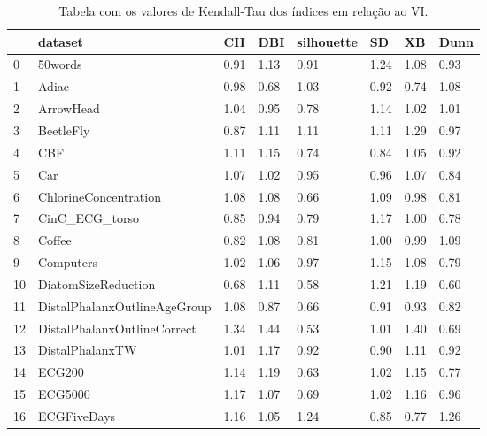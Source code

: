 \begin{longtable}{llllllll}
	\caption{Tabela com os valores de Kendall-Tau dos índices em relação ao VI.}
	 \label{tbl:coherence}\\
	\toprule
	{} &                         dataset &    CH &   DBI & silhouette &    SD &    XB &  Dunn \\
	\midrule
	0  &                         50words &  0.91 &  1.13 &       0.91 &  1.24 &  1.08 &  0.93 \\
	1  &                           Adiac &  0.98 &  0.68 &       1.03 &  0.92 &  0.74 &  1.08 \\
	2  &                       ArrowHead &  1.04 &  0.95 &       0.78 &  1.14 &  1.02 &  1.01 \\
	3  &                       BeetleFly &  0.87 &  1.11 &       1.11 &  1.11 &  1.29 &  0.97 \\
	4  &                             CBF &  1.11 &  1.15 &       0.74 &  0.84 &  1.05 &  0.92 \\
	5  &                             Car &  1.07 &  1.02 &       0.95 &  0.96 &  1.07 &  0.84 \\
	6  &           ChlorineConcentration &  1.08 &  1.08 &       0.66 &  1.09 &  0.98 &  0.81 \\
	7  &                  CinC\_ECG\_torso &  0.85 &  0.94 &       0.79 &  1.17 &  1.00 &  0.78 \\
	8  &                          Coffee &  0.82 &  1.08 &       0.81 &  1.00 &  0.99 &  1.09 \\
	9  &                       Computers &  1.02 &  1.06 &       0.97 &  1.15 &  1.08 &  0.79 \\
	10 &             DiatomSizeReduction &  0.68 &  1.11 &       0.58 &  1.21 &  1.19 &  0.60 \\
	11 &    DistalPhalanxOutlineAgeGroup &  1.08 &  0.87 &       0.66 &  0.91 &  0.93 &  0.82 \\
	12 &     DistalPhalanxOutlineCorrect &  1.34 &  1.44 &       0.53 &  1.01 &  1.40 &  0.69 \\
	13 &                 DistalPhalanxTW &  1.01 &  1.17 &       0.92 &  0.90 &  1.11 &  0.92 \\
	14 &                          ECG200 &  1.14 &  1.19 &       0.63 &  1.02 &  1.15 &  0.77 \\
	15 &                         ECG5000 &  1.17 &  1.07 &       0.69 &  1.02 &  1.16 &  0.96 \\
	16 &                     ECGFiveDays &  1.16 &  1.05 &       1.24 &  0.85 &  0.77 &  1.26 \\

\end{longtable}
